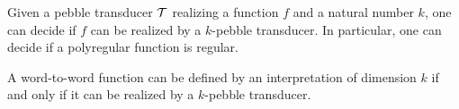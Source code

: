 \begin{theorem}
    Given a pebble transducer ${\mathcal T}$ realizing a function $f$ and a natural number $k$, one can decide if $f$ can be realized by a $k$-pebble transducer. In particular, one can decide if a polyregular function is regular.
\end{theorem}

\begin{corollary}
    A word-to-word function can be defined by an \mso interpretation of dimension $k$ if and only if it can be realized by a $k$-pebble transducer.
\end{corollary}